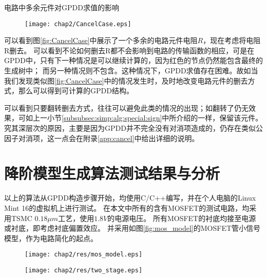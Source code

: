 \begin{exmp}
电路中多余元件对GPDD求值的影响
	
\begin{figure}[!htp]
	\centering
	\texttt{[image: chap2/CancelCase.eps]}
\end{figure}

可以看到图\ref{fig:CancelCase}中展示了一个多余的电路元件电阻$R$，现在考虑将电阻R删去。
可以看到不论如何删去R都不会影响到电路的传输函数的相应，可是在GPDD中，只有下一种情况是可以继续计算的，因为红色的节点仍然能包含最终的生成树中；
而另一种情况则不包含。这种情况下，GPDD求值存在困难。故如当我们发现类似图\ref{fig:CancelCase}中的情况发生时，及时地改变电路元件的删去方式，那么可以得到可计算的GPDD结构。

\end{exmp}

可以看到只要翻转删去方式，往往可以避免此类的情况的出现；如翻转了仍无效果，可如上一小节\ref{subsubsec:simp:alg:special:sign}中所介绍的一样，保留该元件。
究其深层次的原因，主要是因为GPDD并不完全没有对消项造成的，仍存在类似公因子对消项，这一点会在附录\ref{app:cancel}中给出详细的说明。

\section{降阶模型生成算法测试结果与分析}
\label{sec:simp:res}

以上的算法从GPDD构造步骤开始，均使用C/C++编写，并在个人电脑的Linux Mint 16的虚拟机上进行测试。
在本文中所有的含有MOSFET的测试电路，均采用TSMC $0.18 \mu m$工艺，使用$1.8V$的电源电压。
所有MOSFET的衬底均接至电源或衬底，即考虑衬底偏置效应。
并采用如图\ref{fig:mos_model}的MOSFET管小信号模型，作为电路简化的起点。

\begin{figure}[!htp]
	\centering
	\texttt{[image: chap2/res/mos\_model.eps]}
\end{figure}

\begin{figure}[!htp]
	\centering
	\texttt{[image: chap2/res/two\_stage.eps]}
\end{figure}

